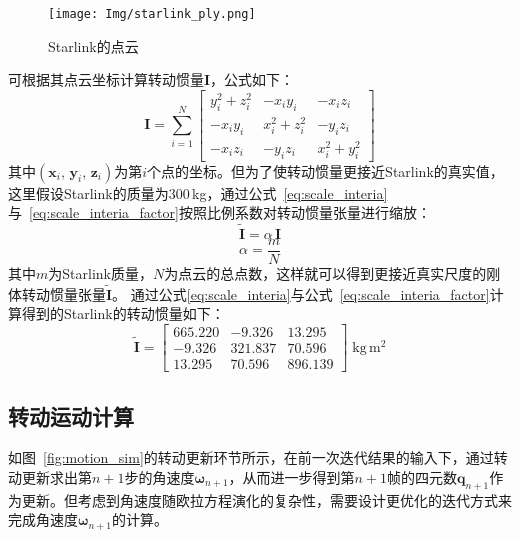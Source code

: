 \begin{figure}[!htbp]
	\centering
	\texttt{[image: Img/starlink\_ply.png]}
	\caption{Starlink的点云}
	\label{fig:starlink_pointcloud}
\end{figure}
\endgroup
可根据其点云坐标计算转动惯量$ \mathbf{I} $，公式如下：
\begin{equation}
	\mathbf{I} =
	\sum_{i=1}^{N}
	\begin{bmatrix}
		y_i^2 + z_i^2 & -x_i y_i      & -x_i z_i \\
		-x_i y_i      & x_i^2 + z_i^2 & -y_i z_i \\
		-x_i z_i      & -y_i z_i      & x_i^2 + y_i^2
	\end{bmatrix}
\end{equation}
其中$(\mathbf{x}_i,\,\mathbf{y}_i,\,\mathbf{z}_i)$为第$i$个点的坐标。但为了使转动惯量更接近Starlink的真实值，这里假设Starlink的质量为300\,kg，通过公式~\ref{eq:scale_interia}与~\ref{eq:scale_interia_factor}按照比例系数对转动惯量张量进行缩放：
\begin{equation}
	\label{eq:scale_interia}
	\widetilde{\mathbf{I}} = \alpha \, \mathbf{I}
\end{equation}
\begin{equation}
	\label{eq:scale_interia_factor}
	\alpha = \frac{m}{N}
\end{equation}
其中$m$为Starlink质量，$N$为点云的总点数，这样就可以得到更接近真实尺度的刚体转动惯量张量$\widetilde{\mathbf{I}}$。
通过公式\ref{eq:scale_interia}与公式~\ref{eq:scale_interia_factor}计算得到的Starlink的转动惯量如下：
\begin{equation}
	\widetilde{\mathbf{I}} =
	\begin{bmatrix}
		665.220 & -9.326 & 13.295 \\
		-9.326 & 321.837 & 70.596 \\
		13.295 & 70.596 & 896.139
	\end{bmatrix}\;\mathrm{kg\,m^{2}}
\end{equation}



\subsection{转动运动计算}

如图~\ref{fig:motion_sim}的转动更新环节所示，在前一次迭代结果的输入下，通过转动更新求出第$n+1$步的角速度$\boldsymbol{\omega}_{n+1}$，从而进一步得到第$n+1$帧的四元数$\mathbf{q}_{n+1}$作为更新。但考虑到角速度随欧拉方程演化的复杂性，需要设计更优化的迭代方式来完成角速度$\boldsymbol{\omega}_{n+1}$的计算。

